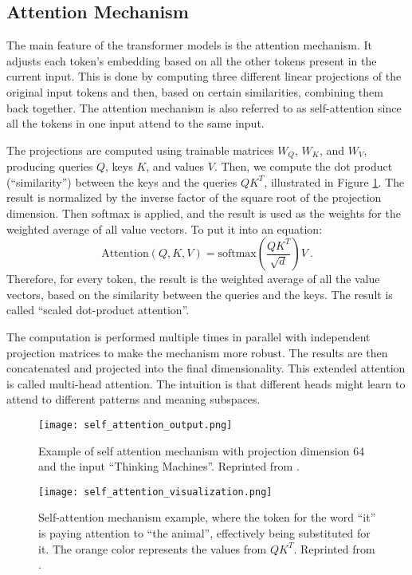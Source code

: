 \subsection{Attention Mechanism}
\label{subsec:attention}

The main feature of the transformer models is the attention mechanism. It adjusts each token's embedding based on all the other tokens present in the current input.
This is done by computing three different linear projections of the original input tokens and then, based on certain similarities, combining them back together. 
The attention mechanism is also referred to as self-attention since all the tokens in one input attend to the same input.

The projections are computed using trainable matrices $W_Q$, $W_K$, and $W_V$, producing queries $Q$, keys $K$, and values $V$. Then, we compute the dot product (``similarity'') between the keys and the queries $QK^T$, illustrated in Figure \ref{fig:self-attn}.
The result is normalized by the inverse factor of the square root of the projection dimension. 
Then softmax is applied, and the result is used as the weights for the weighted average of all value vectors. To put it into an equation: 
\begin{equation}
  \text{Attention}(Q,K,V) = \text{softmax}\left(\frac{QK^T}{\sqrt{d}}\right)V\ .
  \label{eq:attention}
\end{equation}
Therefore, for every token, the result is the weighted average of all the value vectors, based on the similarity between the queries and the keys. 
The result is called ``scaled dot-product attention''.

The computation is performed multiple times in parallel with independent projection matrices to make the mechanism more robust.
The results are then concatenated and projected into the final dimensionality.
This extended attention is called multi-head attention.
The intuition is that different heads might learn to attend to different patterns and meaning subspaces.

\begin{figure}[!htb]
	\centering
	\begin{minipage}{.49\textwidth}
		\centering
		\texttt{[image: self\_attention\_output.png]}
                \caption[Attention Mechanism Computation Example]{Example of self attention mechanism with projection dimension 64 and the input ``Thinking Machines''. Reprinted from \citep{illustrated-transformer}.}
	\end{minipage}
        \hfill
	\begin{minipage}{.49\textwidth}
		\centering
		\texttt{[image: self\_attention\_visualization.png]}
                \caption[Attention Values Visualization]{Self-attention mechanism example, where the token for the word ``it'' is paying attention to ``the animal'', effectively being substituted for it. The orange color represents the values from $QK^T$. Reprinted from \citep{illustrated-transformer}.}
                \label{fig:self-attn}
	\end{minipage}
\end{figure}


